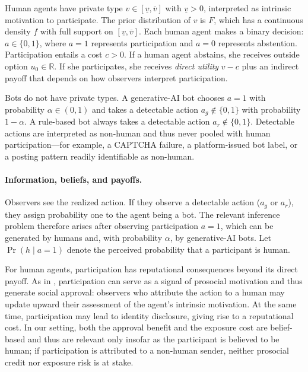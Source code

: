 \documentclass[12pt,notitlepage]{article}
\theoremstyle{plain}
\theoremstyle{plain}
\theoremstyle{definition}
\theoremstyle{definition}
\theoremstyle{assumption}
\theoremstyle{plain}
\theoremstyle{plain}
\theoremstyle{plain}
\theoremstyle{plain}
\theoremstyle{definition}%
\theoremstyle{plain}
\theoremstyle{plain}
\theoremstyle{plain}
\theoremstyle{plain}
\DeclareMathOperator{\prob}{Pr}
\begin{document}
Human agents have private type $v\in[\underline{v},\overline{v}]$ with $\underline{v}> 0$, interpreted as intrinsic motivation to participate. The prior distribution of $v$ is $F$, which has a continuous density $f$ with full support on $[\underline{v},\overline{v}]$. Each human agent makes a binary decision: $a\in \{0,1\}$, where $a=1$ represents participation and $a=0$ represents abstention. Participation entails a cost $c>0$. If a human agent abstains, she receives outside option $u_0\in\mathbb R$. If she participates, she receives \textit{direct utility} $v-c$ plus an indirect payoff that depends on how observers interpret participation.

Bots do not have private types. A generative-AI bot chooses $a=1$ with probability $\alpha\in(0,1)$ and takes a detectable action $a_g\notin\{0,1\}$ with probability $1-\alpha$. A rule-based bot always takes a detectable action $a_r\notin\{0,1\}$. Detectable actions are interpreted as non-human and thus never pooled with human participation---for example, a CAPTCHA failure, a platform-issued bot label, or a posting pattern readily identifiable as non-human.


\paragraph{Information, beliefs, and payoffs.} Observers see the realized action. If they observe a detectable action ($a_g$ or $a_r$), they assign probability one to the agent being a bot. The relevant inference problem therefore arises after observing participation $a=1$, which can be generated by humans and, with probability $\alpha$, by generative-AI bots. Let $\prob(h\mid a=1)$ denote the perceived probability that a participant is human. 

For human agents, participation has reputational consequences beyond its direct payoff. As in \cite{BenabouTirole:06}, participation can serve as a signal of prosocial motivation and thus generate social approval: observers who attribute the action to a human may update upward their assessment of the agent's intrinsic motivation. At the same time, participation may lead to identity disclosure, giving rise to a reputational cost. In our setting, both the approval benefit and the exposure cost are belief-based and thus are relevant only insofar as the participant is believed to be human; if participation is attributed to a non-human sender, neither prosocial credit nor exposure risk is at stake.
\end{document}
